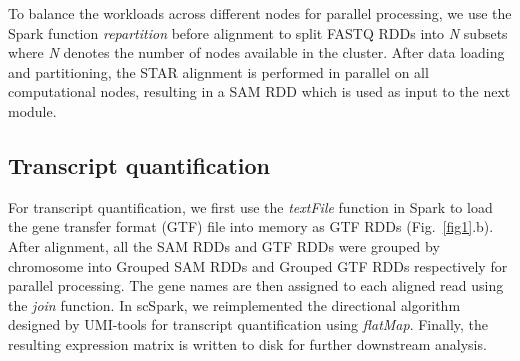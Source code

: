 \documentclass[conference]{IEEEtran}
\begin{document}
To balance the workloads across different nodes for parallel processing, we use the Spark function \textit{repartition} before alignment to split FASTQ RDDs into \textit{N} subsets where \textit{N} denotes the number of nodes available in the cluster. After data loading and partitioning, the STAR alignment is performed in parallel on all computational nodes, resulting in a SAM RDD which is used as input to the next module. 

\subsection{Transcript quantification}

For transcript quantification, we first use the \textit{textFile} function in Spark to load the gene transfer format (GTF) file into memory as GTF RDDs (Fig.~\ref{fig1}.b). 
After alignment, all the SAM RDDs and GTF RDDs were grouped by chromosome into Grouped SAM RDDs and Grouped GTF RDDs respectively for parallel processing. 
The gene names are then assigned to each aligned read using the \textit{join} function. 
In scSpark, we reimplemented the directional algorithm designed by UMI-tools for transcript quantification using \textit{flatMap}. 
Finally, the resulting expression matrix is written to disk for further downstream analysis.
\end{document}
